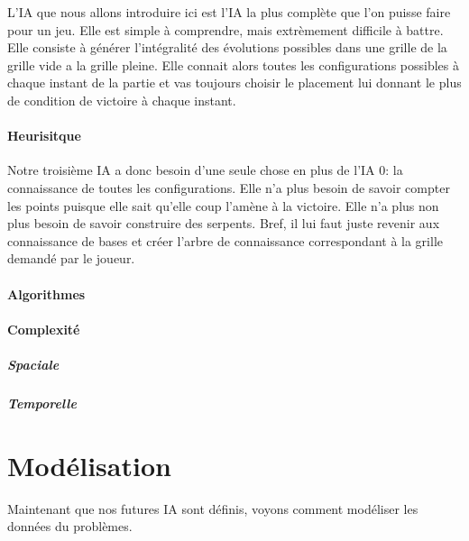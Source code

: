 \documentclass[a4paper,12pt]{report}
\begin{document}
L'IA que nous allons introduire ici est l'IA la plus compl\`ete que l'on puisse faire pour un jeu. Elle est simple \`a comprendre, mais extr\`emement difficile \`a battre. Elle consiste \`a g\'en\'erer l'int\'egralit\'e des \'evolutions possibles dans une grille de la grille vide a la grille pleine. Elle connait alors toutes les configurations possibles \`a chaque instant de la partie et vas toujours choisir le placement lui donnant le plus de condition de victoire \`a chaque instant.

\subsection{Heurisitque}

Notre troisi\`eme IA a donc besoin d'une seule chose en plus de l'IA 0: la connaissance de toutes les configurations. Elle n'a plus besoin de savoir compter les points puisque elle sait qu'elle coup l'am\`ene \`a la victoire. Elle n'a plus non plus besoin de savoir construire des serpents. Bref, il lui faut juste revenir aux connaissance de bases et cr\'eer l'arbre de connaissance correspondant \`a la grille demand\'e par le joueur.

\subsection{Algorithmes}

\subsection{Complexit\'e}

\subsubsection{Spaciale}

\subsubsection{Temporelle}

\part{Mod\'elisation}

Maintenant que nos futures IA sont d\'efinis, voyons comment mod\'eliser les donn\'ees du probl\`emes.
\end{document}
